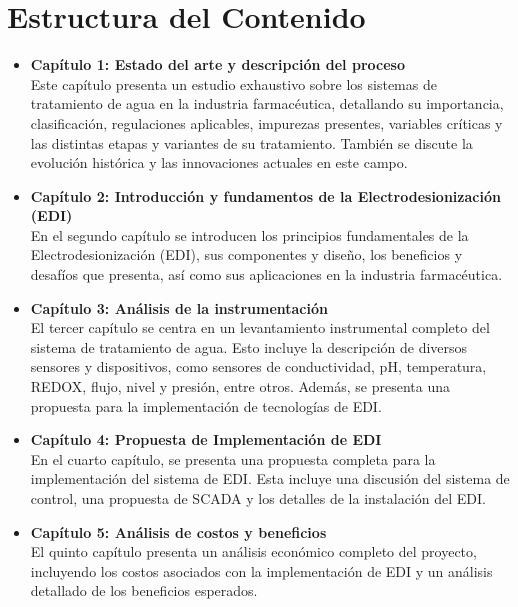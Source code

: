\section*{Estructura del Contenido}

\begin{itemize}

    \item \textbf{Capítulo 1: Estado del arte y descripción del proceso} \\ Este capítulo presenta un estudio exhaustivo sobre los sistemas de tratamiento de agua en la industria farmacéutica, detallando su importancia, clasificación, regulaciones aplicables, impurezas presentes, variables críticas y las distintas etapas y variantes de su tratamiento. También se discute la evolución histórica y las innovaciones actuales en este campo.

    \item \textbf{Capítulo 2: Introducción y fundamentos de la Electrodesionización (EDI)} \\ En el segundo capítulo se introducen los principios fundamentales de la Electrodesionización (EDI), sus componentes y diseño, los beneficios y desafíos que presenta, así como sus aplicaciones en la industria farmacéutica.

    \item \textbf{Capítulo 3: Análisis de la instrumentación} \\ El tercer capítulo se centra en un levantamiento instrumental completo del sistema de tratamiento de agua. Esto incluye la descripción de diversos sensores y dispositivos, como sensores de conductividad, pH, temperatura, REDOX, flujo, nivel y presión, entre otros. Además, se presenta una propuesta para la implementación de tecnologías de EDI.

    \item \textbf{Capítulo 4: Propuesta de Implementación de EDI} \\ En el cuarto capítulo, se presenta una propuesta completa para la implementación del sistema de EDI. Esta incluye una discusión del sistema de control, una propuesta de SCADA y los detalles de la instalación del EDI.

    \item \textbf{Capítulo 5: Análisis de costos y beneficios} \\ El quinto capítulo presenta un análisis económico completo del proyecto, incluyendo los costos asociados con la implementación de EDI y un análisis detallado de los beneficios esperados.

\end{itemize}
